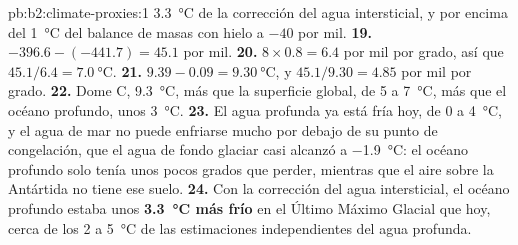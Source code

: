 \begin{solution}{pb:b2:climate-proxies:1}
\qty{3.3}{\celsius} de la corrección del agua intersticial, y por encima del \qty{1}{\celsius} del balance
de masas con hielo a $-40$ por mil.
\textbf{19.} $-396.6 - (-441.7) = 45.1$ por mil.
\textbf{20.} $8 \times 0.8 = 6.4$ por mil por grado, así que $45.1/6.4 = \qty{7.0}{\celsius}$.
\textbf{21.} $9.39 - 0.09 = \qty{9.30}{\celsius}$, y $45.1/9.30 = 4.85$ por mil por grado.
\textbf{22.} Dome C, \qty{9.3}{\celsius}, más que la superficie global, de 5 a \qty{7}{\celsius}, más
que el océano profundo, unos \qty{3}{\celsius}.
\textbf{23.} El agua profunda ya está fría hoy, de 0 a \qty{4}{\celsius}, y el agua de mar no puede
enfriarse mucho por debajo de su punto de congelación, que el agua de fondo glaciar casi alcanzó a
\qty{-1.9}{\celsius}: el océano profundo solo tenía unos pocos grados que perder, mientras que el aire sobre la Antártida
no tiene ese suelo.
\textbf{24.} Con la corrección del agua intersticial, el océano profundo estaba unos \textbf{\qty{3.3}{\celsius}
más frío} en el Último Máximo Glacial que hoy, cerca de los 2 a \qty{5}{\celsius} de las
estimaciones independientes del agua profunda.
\end{solution}
